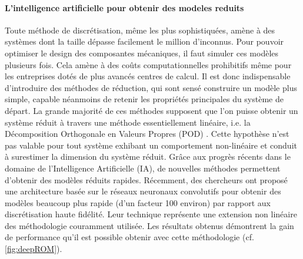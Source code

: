 \documentclass[12pt, french]{article}
\begin{document}
\paragraph{\large L'intelligence artificielle pour obtenir des modeles reduits\\}
Toute méthode de discrétisation, même les plus sophistiquées, amène à des systèmes dont la taille dépasse facilement le million d'inconnus. Pour pouvoir optimiser le design des composantes mécaniques, il faut simuler ces modèles plusieurs fois. Cela amène à des coûts computationnelles prohibitifs même pour les entreprises dotés de plus avancés centres de calcul. Il est donc indispensable d'introduire des méthodes de réduction, qui sont sensé construire un modèle plus simple, capable néanmoins de retenir les propriétés principales du système de départ. La grande majorité de ces méthodes supposent que l'on puisse obtenir un système réduit à travers une méthode essentiellement linéaire, i.e. la Décomposition Orthogonale en Valeurs Propres (POD) \cite{shinde2019,tello2020fluid}. Cette hypothèse n’est pas valable pour tout système exhibant un comportement non-linéaire et conduit à surestimer la dimension du système réduit. Grâce aux progrès récents dans le domaine de l'Intelligence
Artificielle (IA), de nouvelles méthodes permettent d'obtenir des modèles réduits rapides. Récemment, des chercheurs ont proposé une architecture basée sur le réseaux neuronaux convolutifs \cite{lee2020} pour obtenir des modèles beaucoup plus rapide (d'un facteur 100 environ) par rapport aux discrétisation haute fidélité. Leur technique représente une extension non linéaire des méthodologie couramment utilisée. Les résultats obtenus démontrent la gain de performance qu'il est possible obtenir avec cette méthodologie (cf. \ref{fig:deepROM}).
\end{document}
